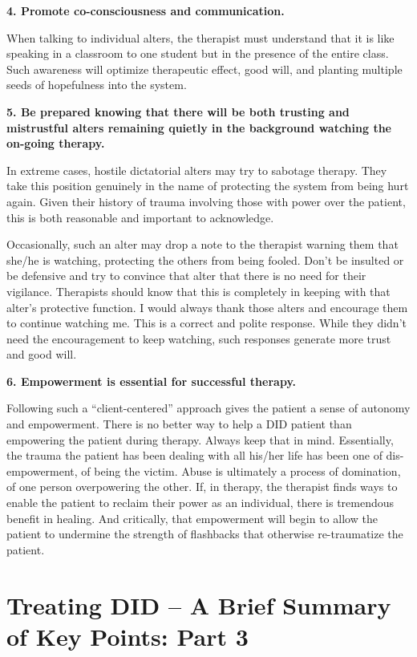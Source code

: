 \documentclass[]{book}
\begin{document}
\textbf{4. Promote co-consciousness and communication.}

When talking to individual alters, the therapist must understand that it is like speaking in a classroom to one student but in the presence of the entire class. Such awareness will optimize therapeutic effect, good will, and planting multiple seeds of hopefulness into the system.

\textbf{5. Be prepared knowing that there will be both trusting and mistrustful alters remaining quietly in the background watching the on-going therapy.}

In extreme cases, hostile dictatorial alters may try to sabotage therapy. They take this position genuinely in the name of protecting the system from being hurt again. Given their history of trauma involving those with power over the patient, this is both reasonable and important to acknowledge.

Occasionally, such an alter may drop a note to the therapist warning them that she/he is watching, protecting the others from being fooled. Don't be insulted or be defensive and try to convince that alter that there is no need for their vigilance. Therapists should know that this is completely in keeping with that alter's protective function. I would always thank those alters and encourage them to continue watching me. This is a correct and polite response. While they didn't need the encouragement to keep watching, such responses generate more trust and good will.

\textbf{6. Empowerment is essential for successful therapy.}

Following such a ``client-centered'' approach gives the patient a sense of autonomy and empowerment. There is no better way to help a DID patient than empowering the patient during therapy. Always keep that in mind. Essentially, the trauma the patient has been dealing with all his/her life has been one of dis-empowerment, of being the victim. Abuse is ultimately a process of domination, of one person overpowering the other. If, in therapy, the therapist finds ways to enable the patient to reclaim their power as an individual, there is tremendous benefit in healing. And critically, that empowerment will begin to allow the patient to undermine the strength of flashbacks that otherwise re-traumatize the patient.

\hypertarget{treating-did-a-brief-summary-of-key-points-part-3}{%
\section{Treating DID -- A Brief Summary of Key Points: Part 3}\label{treating-did-a-brief-summary-of-key-points-part-3}}
\end{document}
